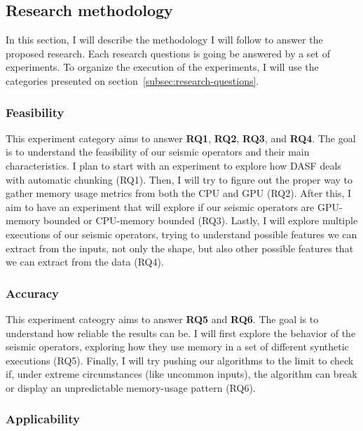 \subsection{Research methodology}
\label{subsec:research-methodology}

In this section, I will describe the methodology I will follow to answer the proposed research.
Each research questions is going be answered by a set of experiments.
To organize the execution of the experiments, I will use the categories presented on section~\ref{subsec:research-questions}.

\subsubsection{Feasibility}

This experiment category aims to answer \textbf{RQ1}, \textbf{RQ2}, \textbf{RQ3}, and \textbf{RQ4}.
The goal is to understand the feasibility of our seismic operators and their main characteristics.
I plan to start with an experiment to explore how DASF deals with automatic chunking (RQ1).
Then, I will try to figure out the proper way to gather memory usage metrics from both the CPU and GPU (RQ2).
After this, I aim to have an experiment that will explore if our seismic operators are GPU-memory bounded or CPU-memory bounded (RQ3).
Lastly, I will explore multiple executions of our seismic operators, trying to understand possible features we can extract from the inputs, not only the shape, but also other possible features that we can extract from the data (RQ4).

\subsubsection{Accuracy}

This experiment cateogry aims to answer \textbf{RQ5} and \textbf{RQ6}.
The goal is to understand how reliable the results can be.
I will first explore the behavior of the seismic operators, exploring how they use memory in a set of different synthetic executions (RQ5).
Finally, I will try pushing our algorithms to the limit to check if, under extreme circumstances (like uncommon inputs), the algorithm can break or display an unpredictable memory-usage pattern (RQ6).

\subsubsection{Applicability}

